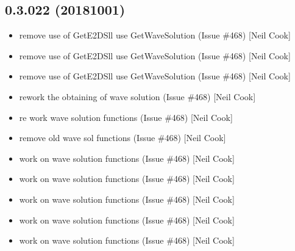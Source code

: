 \documentclass[a4paper,10pt,english]{report}
\begin{document}
\subsection{0.3.022 (2018\sphinxhyphen{}10\sphinxhyphen{}01)}
\label{\detokenize{misc/changelog:id329}}\begin{itemize}
\item {} 
 \sphinxhyphen{} remove use of GetE2DSll \sphinxhyphen{} use
GetWaveSolution (Issue \#468) {[}Neil Cook{]}

\item {} 
 \sphinxhyphen{} remove use of GetE2DSll \sphinxhyphen{} use GetWaveSolution (Issue
\#468) {[}Neil Cook{]}

\item {} 
 \sphinxhyphen{} remove use of GetE2DSll \sphinxhyphen{} use GetWaveSolution
(Issue \#468) {[}Neil Cook{]}

\item {} 
 \sphinxhyphen{} re\sphinxhyphen{}work the obtaining of wave solution (Issue \#468)
{[}Neil Cook{]}

\item {} 
 \sphinxhyphen{} re work wave solution functions (Issue \#468) {[}Neil
Cook{]}

\item {} 
 \sphinxhyphen{} remove old wave sol functions (Issue \#468)
{[}Neil Cook{]}

\item {} 
 \sphinxhyphen{} work on wave solution functions (Issue \#468)
{[}Neil Cook{]}

\item {} 
 \sphinxhyphen{} work on wave solution functions (Issue \#468) {[}Neil
Cook{]}

\item {} 
 \sphinxhyphen{} work on wave solution functions (Issue
\#468) {[}Neil Cook{]}

\item {} 
 \sphinxhyphen{} work on wave solution functions (Issue \#468)
{[}Neil Cook{]}

\item {} 
 \sphinxhyphen{} work on wave solution functions (Issue \#468)
{[}Neil Cook{]}


\end{itemize}
\end{document}

